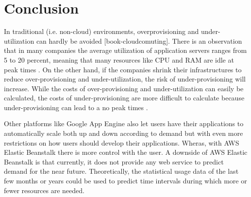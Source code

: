 \documentclass[9pt,twocolumn,twoside]{styles/osajnl}
\begin{document}
\section{Conclusion}

In traditional (i.e. non-cloud) environments, overprovisioning and
under-utilization can hardly be avoided [book-cloudcomuting]. There is
an observation that in many companies the average utilization of
application servers ranges from 5 to 20 percent, meaning that many
resources like CPU and RAM are idle at peak times
\cite{cloudcomputing-2}.  On the other hand, if the companies shrink
their infrastructures to reduce over-provisioning and
under-utilization, the risk of under-provisioning will increase. While
the costs of over-provisioning and under-utilization can easily be
calculated, the costs of under-provisioning are more difficult to
calculate because under-provisioning can lead to a no peak times
\cite{cloudcomputing-2}.

Other platforms like Google App Engine \cite{google-appengine} also
let users have their applications to automatically scale both up and
down according to demand but with even more restrictions on how users
should develop their applications. Wheras, with AWS Elastic Beanstalk
there is more control with the user. A downside of AWS Elastic
Beanstalk is that currently, it does not provide any web service to
predict demand for the near future. Theoretically, the statistical
usage data of the last few months or years could be used to predict
time intervals during which more or fewer resources are needed.



 
\end{document}

